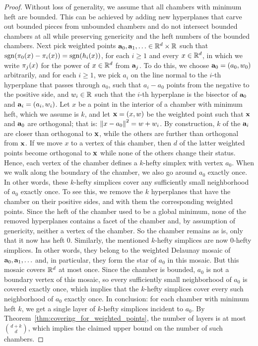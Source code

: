 \documentclass[a4paper,UKenglish,cleveref, autoref,numberwithinsect]{socg-lipics-v2021}
\newcommand {\mm}[1] {\ifmmode{#1}\else{\mbox{\(#1\)}}\fi}
\theoremstyle{plain}
\newcommand{\Rspace}        {\mm{{\mathbb R}}}
\newcommand{\aaa}           {\mm{\bf a}}
\newcommand{\xxx}           {\mm{\bf{x}}}
\newcommand{\wdist}[2]      {\mm{\pi_{#1}{({#2})}}}
\newcommand{\sign}[1]       {\mm{\rm sgn}{({#1})}}
\newcommand{\Edist}[2]      {\mm{\|{#1}-{#2}\|}}
\begin{document}
\begin{proof}
  Without loss of generality, we assume that all chambers with minimum heft are bounded. 
  This can be achieved by adding new hyperplanes that carve out bounded pieces from unbounded chambers and do not intersect bounded chambers at all while preserving genericity and the heft numbers of the bounded chambers.
  Next pick weighted points $\aaa_0, \aaa_1, \ldots \in \Rspace^d \times \Rspace$ such that $\sign{\wdist{0}{x} - \wdist{i}{x}} = \sign{h_i(x)}$, for each $i \geq 1$ and every $x \in \Rspace^d$, in which we write $\wdist{j}{x}$ for the power of $x \in \Rspace^d$ from $\aaa_j$.
  To do this, we choose $\aaa_0 = (a_0, w_0)$ arbitrarily, and for each $i \geq 1$, we pick $a_i$ on the line normal to the $i$-th hyperplane that passes through $a_0$, such that $a_i - a_0$ points from the negative to the positive side, and $w_i \in \Rspace$ such that the $i$-th hyperplane is the bisector of $\aaa_0$ and $\aaa_i = (a_i, w_i)$.
  \smallskip
  Let $x$ be a point in the interior of a chamber with minimum heft, which we assume is $k$, and let $\xxx = (x, w)$ be the weighted point such that $\xxx$ and $\aaa_0$ are orthogonal; that is: $\Edist{x}{a_0}^2 = w + w_i$.
  By construction, $k$ of the $\aaa_i$ are closer than orthogonal to $\xxx$, while the others are further than orthogonal from $\xxx$.
  If we move $x$ to a vertex of this chamber, then $d$ of the latter weighted points become orthogonal to $\xxx$ while none of the others change their status.
  Hence, each vertex of the chamber defines a $k$-hefty simplex with vertex $a_0$.
  \smallskip
  When we walk along the boundary of the chamber, we also go around $a_0$ exactly once.
  In other words, these $k$-hefty simplices cover any sufficiently small neighborhood of $a_0$ exactly once.
  To see this, we remove the $k$ hyperplanes that have the chamber on their positive sides, and with them the corresponding weighted points.
  Since the heft of the chamber used to be a global minimum, none of the removed hyperplanes contains a facet of the chamber and, by assumption of genericity, neither a vertex of the chamber.
  So the chamber remains as is, only that it now has heft $0$.
  Similarly, the mentioned $k$-hefty simplices are now $0$-hefty simplices.
  In other words, they belong to the weighted Delaunay mosaic of $\aaa_0, \aaa_1, \ldots$ and, in particular, they form the star of $a_0$ in this mosaic.
  But this mosaic covers $\Rspace^d$ at most once.
  Since the chamber is bounded, $a_0$ is not a boundary vertex of this mosaic, so every sufficiently small neighborhood of $a_0$ is covered exactly once, which implies that the $k$-hefty simplices cover every such neighborhood of $a_0$ exactly once.
  \smallskip
  In conclusion: for each chamber with minimum heft $k$, we get a single layer of $k$-hefty simplices incident to $a_0$.
  By Theorem~\ref{thm:covering_for_weighted_points}, the number of layers is at most $\binom{d+k}{d}$, which implies the claimed upper bound on the number of such chambers.
\end{proof}
\end{document}

